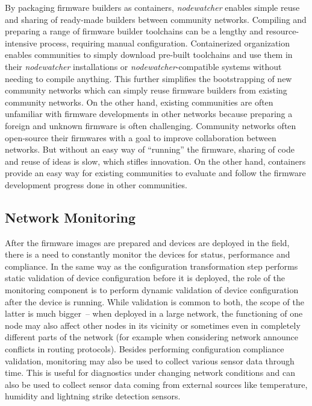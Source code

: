 \documentclass[5p,sort&compress]{elsarticle}
\newcommand{\nodewatcher}{\textit{nodewatcher}}
\begin{document}
By packaging firmware builders as containers, \nodewatcher{} enables simple reuse and sharing of ready-made builders between community networks.
Compiling and preparing a range of firmware builder toolchains can be a lengthy and resource-intensive process, requiring manual configuration.
Containerized organization enables communities to simply download pre-built toolchains and use them in their \nodewatcher{} installations or \nodewatcher{}-compatible systems without needing to compile anything.
This further simplifies the bootstrapping of new community networks which can simply reuse firmware builders from existing community networks.
On the other hand, existing communities are often unfamiliar with firmware developments in other networks because preparing a foreign and unknown firmware is often challenging.
Community networks often open-source their firmwares with a goal to improve collaboration between networks.
But without an easy way of ``running'' the firmware, sharing of code and reuse of ideas is slow, which stifles innovation.
On the other hand, containers provide an easy way for existing communities to evaluate and follow the firmware development progress done in other communities.

\subsection{Network Monitoring}
\label{sec:network-monitoring}

After the firmware images are prepared and devices are deployed in the field, there is a need to constantly monitor the devices for status, performance and compliance.
In the same way as the configuration transformation step performs static validation of device configuration before it is deployed, the role of the monitoring component is to perform dynamic validation of device configuration after the device is running.
While validation is common to both, the scope of the latter is much bigger~-- when deployed in a large network, the functioning of one node may also affect other nodes in its vicinity or sometimes even in completely different parts of the network (for example when considering network announce conflicts in routing protocols).
Besides performing configuration compliance validation, monitoring may also be used to collect various sensor data through time.
This is useful for diagnostics under changing network conditions and can also be used to collect sensor data coming from external sources like temperature, humidity and lightning strike detection sensors.
\end{document}
